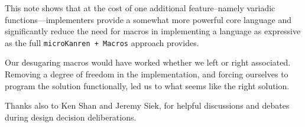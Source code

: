 \documentclass[sigplan,screen,draft,anonymous,review,natbib=false]{acmart}
\begin{document}
This note shows that at the cost of one additional feature--namely
variadic functions---implementers provide a somewhat more powerful
core language and significantly reduce the need for macros in
implementing a language as expressive as the full
\verb|microKanren + Macros| approach provides.

Our desugaring macros would have worked whether we left or right
associated. Removing a degree of freedom in the implementation, and
forcing ourselves to program the solution functionally, led us to what
seems like the right solution.

\begin{acks}

Thanks also to Ken Shan and Jeremy Siek, for helpful discussions and
debates during design decision deliberations.

\end{acks}

\printbibliography{}
\end{document}
